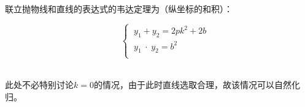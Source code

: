 \documentclass[UTF8]{ctexart}
\begin{document}
    联立抛物线和直线的表达式的韦达定理为（纵坐标的和积）：\vspace{3pt}
    \begin{large}
        \begin{equation*}
            ~~~~~~\begin{cases}
                ~y_1+y_2=2pk^2+2b\\[1mm]
                ~y_1\hspace{3pt}\cdot\hspace{3pt}y_2=b^2\\[1mm]
            \end{cases}
        \end{equation*}
    \end{large}\\[1mm]
    此处不必特别讨论$k=0$的情况，由于此时直线选取合理，故该情况可以自然化归。

\newpage
\end{document}
